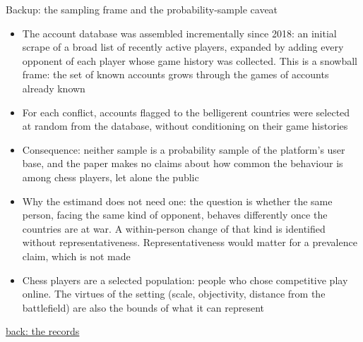\documentclass[aspectratio=169,11pt,t]{beamer}
\newcommand{\backto}[2]{\vfill\hfill\hyperlink{#1}{\textcolor{linkblue}{\scriptsize\textsf{back: #2}}}}
\begin{document}
\begin{frame}[label=bk-frame]{Backup: the sampling frame and the probability-sample caveat}
  \small
  \begin{itemize}
    \item The account database was assembled incrementally since 2018: an initial scrape of a broad list of recently active players, expanded by adding every opponent of each player whose game history was collected. This is a snowball frame: the set of known accounts grows through the games of accounts already known
    \item For each conflict, accounts flagged to the belligerent countries were selected at random from the database, without conditioning on their game histories
    \item Consequence: neither sample is a probability sample of the platform's user base, and the paper makes no claims about how common the behaviour is among chess players, let alone the public
    \item Why the estimand does not need one: the question is whether the same person, facing the same kind of opponent, behaves differently once the countries are at war. A within-person change of that kind is identified without representativeness. Representativeness would matter for a prevalence claim, which is not made
    \item Chess players are a selected population: people who chose competitive play online. The virtues of the setting (scale, objectivity, distance from the battlefield) are also the bounds of what it can represent
  \end{itemize}
  \backto{records}{the records}
\end{frame}
\end{document}
